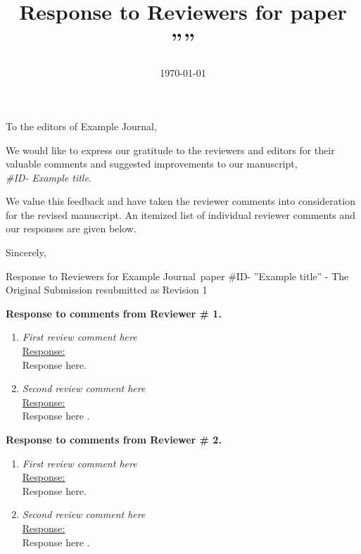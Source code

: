 \documentclass[english]{ethbrief3}
\date{\today}
\title{\vspace{-10mm}Response to Reviewers for \journalTitle paper \articleAbbr  ''\articleTitle''  }
\newcommand{\articleTitle}{Example title}
\newcommand{\articleAbbr}{\#ID}
\newcommand{\journalTitle}{Example Journal}
\newcommand{\comment}[1]{ { \it #1 \\[5pt]} }
\newcommand{\response}[1]{ { \underline{Response:}\\#1} }
\begin{document}
\begin{letter}{}

\opening{To the editors of \journalTitle,}

We would like to express our gratitude to the reviewers and editors for their valuable comments and suggested improvements to our manuscript, \\{\it \articleAbbr - \articleTitle}. 

We value this feedback and have taken the reviewer comments into consideration for the revised manuscript. An itemized list of individual reviewer comments and our responses are given below.

\closing{Sincerely,}\end{letter}

\newpage
{\Large Response to Reviewers for \journalTitle ~paper \articleAbbr - ''\articleTitle'' - The Original Submission resubmitted as Revision 1}
\vspace{1cm}


{\bf Response to comments from Reviewer \# 1.}

\begin{enumerate}
\item \comment{First review comment here}
\response{Response here.}

\item \comment{Second review comment here}
\response{Response here \cite{biela_2009,kim_2011}.}

\end{enumerate}


{\bf Response to comments from Reviewer \# 2.}

\begin{enumerate}
\item \comment{First review comment here}
\response{Response here.}

\item \comment{Second review comment here}
\response{Response here \cite{ogasawara_2013}.}

\end{enumerate}


\printbibliography
\end{document}
